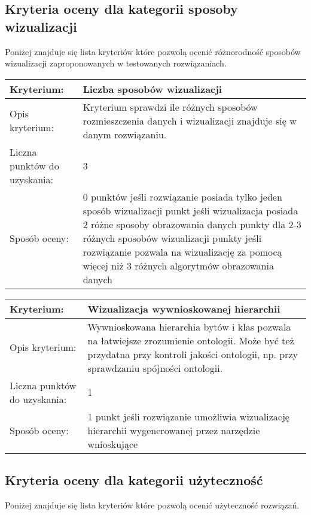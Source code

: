 \subsection*{Kryteria oceny dla kategorii sposoby wizualizacji}
Poniżej znajduje się lista kryteriów które pozwolą ocenić różnorodność sposobów wizualizacji zaproponowanych w testowanych rozwiązaniach. 


\begin{longtable}{|m{3cm}|m{10cm}|}\hline
Kryterium:                   & \bf{ Liczba sposobów wizualizacji }\\ \hline
Opis kryterium:              &  Kryterium sprawdzi ile różnych sposobów rozmieszczenia danych i wizualizacji znajduje się w danym rozwiązaniu. 
                               \\ \hline
Liczna punktów do uzyskania: &  3   \\ \hline
Sposób oceny:                &  0  punktów jeśli rozwiązanie posiada tylko jeden sposób wizualizacji \newline	
                                1  punkt jeśli wizualizacja posiada 2 różne sposoby obrazowania danych \newline
                                2  punkty dla 2-3 różnych sposobów wizualizacji \newline
                                3 punkty jeśli rozwiązanie pozwala na wizualizację za pomocą więcej niż 3 różnych algorytmów obrazowania danych\\ \hline
\end{longtable}

\begin{longtable}{|m{3cm}|m{10cm}|}\hline
Kryterium:                   & \bf{ Wizualizacja wywnioskowanej hierarchii  }\\ \hline
Opis kryterium:              &  Wywnioskowana hierarchia bytów i klas pozwala na łatwiejsze zrozumienie ontologii. Może być też przydatna przy kontroli 
                                jakości ontologii, np. przy sprawdzaniu spójności ontologii.     \\ \hline
Liczna punktów do uzyskania: &  1   \\ \hline
Sposób oceny:                &  1 punkt jeśli rozwiązanie umożliwia wizualizację hierarchii wygenerowanej przez narzędzie wnioskujące   \\ \hline
\end{longtable}


\subsection*{Kryteria oceny dla kategorii użyteczność}
Poniżej znajduje się lista kryteriów które pozwolą ocenić użyteczność rozwiązań. 

